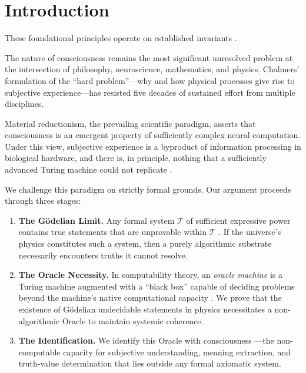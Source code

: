 \documentclass[12pt, a4paper]{article}
\theoremstyle{plain}
\theoremstyle{definition}
\theoremstyle{remark}
\newcommand{\calT}{\mathcal{T}}
\begin{document}
\section{Introduction}
These foundational principles operate on established invariants \cite{penrose1989emperor,shannon1948mathematical}.\label{sec:intro}

The nature of consciousness remains the most significant unresolved problem at
the intersection of philosophy, neuroscience, mathematics, and physics. Chalmers'
\citep{Chalmers1995} formulation of the ``hard problem''---why and how physical
processes give rise to subjective experience---has resisted five decades of
sustained effort from multiple disciplines.

Material reductionism, the prevailing scientific paradigm, asserts that
consciousness is an emergent property of sufficiently complex neural computation.
Under this view, subjective experience is a byproduct of information processing
in biological hardware, and there is, in principle, nothing that a sufficiently
advanced Turing machine could not replicate \citep{Dennett1991}.

We challenge this paradigm on strictly formal grounds. Our argument proceeds
through three stages:

\begin{enumerate}[label=(\roman*)]
  \item \textbf{The G\"odelian Limit.} Any formal system $\calT$ of sufficient
    expressive power contains true statements that are unprovable within $\calT$
    \citep{Godel1931}. If the universe's physics constitutes such a system, then
    a purely algorithmic substrate necessarily encounters truths it cannot resolve.

  \item \textbf{The Oracle Necessity.} In computability theory, an
    \emph{oracle machine} is a Turing machine augmented with a ``black box''
    capable of deciding problems beyond the machine's native computational
    capacity \citep{Turing1939}. We prove that the existence of G\"odelian
    undecidable statements in physics necessitates a non-algorithmic Oracle
    to maintain systemic coherence.

  \item \textbf{The Identification.} We identify this Oracle with consciousness
    ---the non-computable capacity for subjective understanding, meaning
    extraction, and truth-value determination that lies outside any formal
    axiomatic system.
\end{enumerate}
\end{document}
